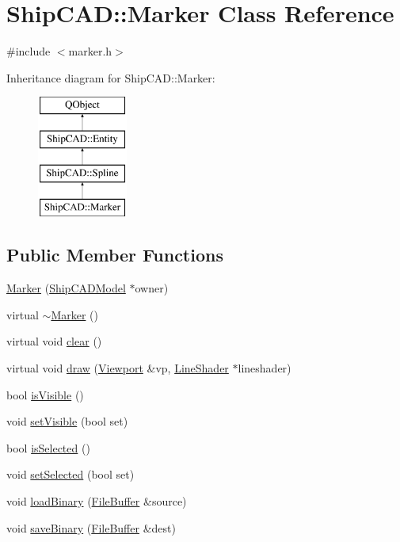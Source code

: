 \hypertarget{classShipCAD_1_1Marker}{\section{Ship\-C\-A\-D\-:\-:Marker Class Reference}
\label{classShipCAD_1_1Marker}
}


{\ttfamily \#include $<$marker.\-h$>$}

Inheritance diagram for Ship\-C\-A\-D\-:\-:Marker\-:\begin{figure}[H]
\begin{center}
\leavevmode
\includegraphics[height=4.000000cm]{classShipCAD_1_1Marker}
\end{center}
\end{figure}
\subsection*{Public Member Functions}
\begin{DoxyCompactItemize}
\item 
\hyperlink{classShipCAD_1_1Marker_a216cf592a0945f6b6923a00c9625e3bf}{Marker} (\hyperlink{classShipCAD_1_1ShipCADModel}{Ship\-C\-A\-D\-Model} $\ast$owner)
\item 
virtual \hyperlink{classShipCAD_1_1Marker_a2f3196a90d442386b0d50f54b69e6116}{$\sim$\-Marker} ()
\item 
virtual void \hyperlink{classShipCAD_1_1Marker_ac7c7eea8648562f3fa00a9e10af6ec97}{clear} ()
\item 
virtual void \hyperlink{classShipCAD_1_1Marker_a0cca647d9b32dc69b03903b024dc3091}{draw} (\hyperlink{classShipCAD_1_1Viewport}{Viewport} \&vp, \hyperlink{classShipCAD_1_1LineShader}{Line\-Shader} $\ast$lineshader)
\item 
bool \hyperlink{classShipCAD_1_1Marker_a693fef3930809d5c4b2ce3755662e367}{is\-Visible} ()
\item 
void \hyperlink{classShipCAD_1_1Marker_af21b0bac028e01ce02ea97bf6f83cccc}{set\-Visible} (bool set)
\item 
bool \hyperlink{classShipCAD_1_1Marker_aac6bc8a781945739646cfc8dd6c5b99c}{is\-Selected} ()
\item 
void \hyperlink{classShipCAD_1_1Marker_ad3bbb4a01e11e3d2885f56599a77a3d1}{set\-Selected} (bool set)
\item 
void \hyperlink{classShipCAD_1_1Marker_a0f2aa7cd6bae40784c077b89d5ebdb50}{load\-Binary} (\hyperlink{classShipCAD_1_1FileBuffer}{File\-Buffer} \&source)
\item 
void \hyperlink{classShipCAD_1_1Marker_abceb4cbb5b038eb88d0f7f26507be15c}{save\-Binary} (\hyperlink{classShipCAD_1_1FileBuffer}{File\-Buffer} \&dest)
\end{DoxyCompactItemize}
